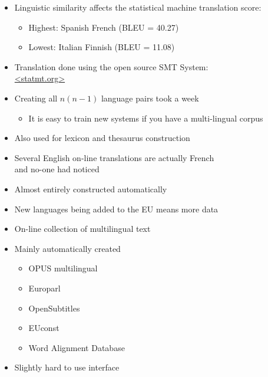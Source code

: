 \documentclass[a4paper,landscape,headrule,footrule,xetex]{foils}
\begin{document}

\begin{itemize}
\item Linguistic similarity affects the statistical machine translation score:
  \begin{itemize}
  \item Highest: Spanish \into French (BLEU = 40.27)
  \item Lowest: Italian \into Finnish  (BLEU = 11.08)
  \end{itemize}

\item Translation done using the open source SMT System:
 \\  \url{<statmt.org>}

\item Creating all $n(n-1)$ language pairs took a week
  \begin{itemize}
  \item It is easy to train new systems if you have a multi-lingual corpus
  \end{itemize}
\end{itemize}


\begin{itemize}
\item Also used for lexicon and thesaurus construction
\item Several English on-line translations are actually French
  \\ and no-one had noticed 
\item Almost entirely constructed automatically
\item New languages being added to the EU means more data
\end{itemize}



\begin{itemize}
\item On-line collection of multilingual text
\item Mainly automatically created
  \begin{itemize}
  \item  OPUS multilingual 
  \item Europarl 
  \item OpenSubtitles 
  \item EUconst 
  \item Word Alignment Database
  \end{itemize}
\item Slightly hard to use interface
\end{itemize}
\end{document}
